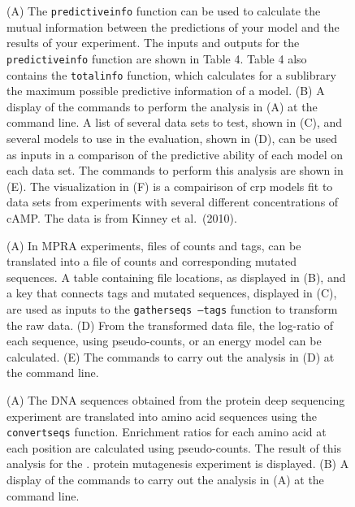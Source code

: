 \documentclass{bmcart}
\begin{document}
%
%
\begin{figure}[h!]
\caption{
(A) The \texttt{predictiveinfo} function can be used to calculate the mutual information between the predictions of your model and the results of your experiment.
The inputs and outputs for the \texttt{predictiveinfo} function are shown in Table 4. Table 4 also contains the \texttt{totalinfo} function, which calculates for 
a sublibrary the maximum possible predictive information of a model.
(B) A display of the commands to perform the analysis in (A) at the command line.
A list of several data sets to test, shown in (C), and several models
to use in the evaluation, shown in (D), can be used as inputs in a comparison
of the predictive ability of each model on each data set. The commands to perform
this analysis are shown in (E). The visualization in (F) is a compairison of crp models fit to data sets from
experiments with several different concentrations of cAMP. The data is from Kinney et al.\ (2010).
}
\end{figure}

%
%
\begin{figure}[h!]
\caption{
(A) In MPRA experiments, files of counts and tags, can be translated into 
a file of counts and corresponding mutated sequences. A table containing file locations,
as displayed in (B), and a key that connects tags and mutated sequences, displayed in (C), are used
as inputs to the \texttt{gatherseqs --tags} function to transform the raw data. 
(D) From the transformed data file, the log-ratio of each sequence, using pseudo-counts,
 or an energy model can be calculated.
(E) The commands to carry out the analysis in (D) at the command line.
}
\end{figure}

%
%
\begin{figure}[h!]
\caption{
(A) The DNA sequences obtained from the \cite{Fowler:2010gt,Fowler:2014gq} protein deep sequencing experiment are translated
into amino acid sequences using the \texttt{convertseqs} function. Enrichment ratios for each amino acid at each position are calculated
using pseudo-counts. The result of this analysis for the \cite{Fowler:2010gt,Fowler:2014gq}. protein
mutagenesis experiment is displayed.
(B) A display of the commands to carry out the analysis in (A) at the command line.
}
\end{figure}
\end{document}
